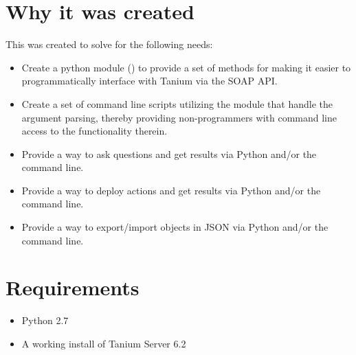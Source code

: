 \documentclass[letterpaper,10pt,english]{sphinxmanual}
\begin{document}
\section{Why it was created}
\label{description:why-it-was-created}
This was created to solve for the following needs:
\begin{itemize}
\item {} 
Create a python module ({\hyperref[taniumpy:module-taniumpy]{}}) to provide a set of methods for making it easier to programmatically interface with Tanium via the SOAP API.

\item {} 
Create a set of command line scripts utilizing the {\hyperref[taniumpy:module-taniumpy]{}} module that handle the argument parsing, thereby providing non-programmers with command line access to the functionality therein.

\item {} 
Provide a way to ask questions and get results via Python and/or the command line.

\item {} 
Provide a way to deploy actions and get results via Python and/or the command line.

\item {} 
Provide a way to export/import objects in JSON via Python and/or the command line.

\end{itemize}


\section{Requirements}
\label{description:requirements}\begin{itemize}
\item {} 
Python 2.7

\item {} 
A working install of Tanium Server 6.2

\end{itemize}
\end{document}
